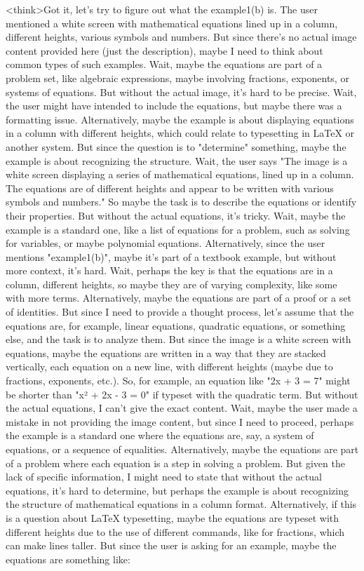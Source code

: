 <think>Got it, let's try to figure out what the example1(b) is. The user mentioned a white screen with mathematical equations lined up in a column, different heights, various symbols and numbers. But since there's no actual image content provided here (just the description), maybe I need to think about common types of such examples. Wait, maybe the equations are part of a problem set, like algebraic expressions, maybe involving fractions, exponents, or systems of equations. But without the actual image, it's hard to be precise. Wait, the user might have intended to include the equations, but maybe there was a formatting issue. Alternatively, maybe the example is about displaying equations in a column with different heights, which could relate to typesetting in LaTeX or another system. But since the question is to "determine" something, maybe the example is about recognizing the structure. Wait, the user says "The image is a white screen displaying a series of mathematical equations, lined up in a column. The equations are of different heights and appear to be written with various symbols and numbers." So maybe the task is to describe the equations or identify their properties. But without the actual equations, it's tricky. Wait, maybe the example is a standard one, like a list of equations for a problem, such as solving for variables, or maybe polynomial equations. Alternatively, since the user mentions "example1(b)", maybe it's part of a textbook example, but without more context, it's hard. Wait, perhaps the key is that the equations are in a column, different heights, so maybe they are of varying complexity, like some with more terms. Alternatively, maybe the equations are part of a proof or a set of identities. But since I need to provide a thought process, let's assume that the equations are, for example, linear equations, quadratic equations, or something else, and the task is to analyze them. But since the image is a white screen with equations, maybe the equations are written in a way that they are stacked vertically, each equation on a new line, with different heights (maybe due to fractions, exponents, etc.). So, for example, an equation like "2x + 3 = 7" might be shorter than "x² + 2x - 3 = 0" if typeset with the quadratic term. But without the actual equations, I can't give the exact content. Wait, maybe the user made a mistake in not providing the image content, but since I need to proceed, perhaps the example is a standard one where the equations are, say, a system of equations, or a sequence of equalities. Alternatively, maybe the equations are part of a problem where each equation is a step in solving a problem. But given the lack of specific information, I might need to state that without the actual equations, it's hard to determine, but perhaps the example is about recognizing the structure of mathematical equations in a column format. Alternatively, if this is a question about LaTeX typesetting, maybe the equations are typeset with different heights due to the use of different commands, like \frac for fractions, which can make lines taller. But since the user is asking for an example, maybe the equations are something like:

